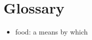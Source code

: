 \section{Glossary}

\newcommand{\glossaryitem}[2]{\item[]{#1: #2}}

\begin{itemize}
\glossaryitem{food}{a means by which}
\end{itemize}